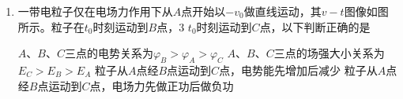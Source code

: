 \begin{enumerate} [leftmargin=0em]
\item
{}
一带电粒子仅在电场力作用下从$ A $点开始以$ -v_{0} $做直线运动，其$ v-t $图像如图所示。粒子在$ t_{0} $时刻运动到$ B $点，$ 3 $ $ t_{0} $时刻运动到$ C $点，以下判断正确的是  
\begin{figure}[h!]
\centering

\end{figure}


\fourchoices
{$ A $、$ B $、$ C $三点的电势关系为$\varphi _ { B } > \varphi _ { A } > \varphi _ { C }$}
{$ A $、$ B $、$ C $三点的场强大小关系为$E _ { C } > E _ { B } > E _ { A }$}
{粒子从$ A $点经$ B $点运动到$ C $点，电势能先增加后减少}
{粒子从$ A $点经$ B $点运动到$ C $点，电场力先做正功后做负功}





\end{enumerate}








